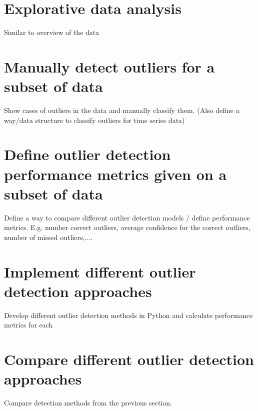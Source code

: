 \section{Explorative data analysis}
Similar to overview of the data
\section{Manually detect outliers for a subset of data}
Show cases of outliers in the data and manually classify them. (Also define a way/data structure to classify outliers for time series data)
\section{Define outlier detection performance metrics given on a subset of data}
Define a way to compare different outlier detection models / define performance metrics. E.g. number correct outliers, average confidence for the correct outliers, number of missed outliers,.... 
\section{Implement different outlier detection approaches}
Develop different outlier detection methods in Python and calculate performance metrics for each
\section{Compare different outlier detection approaches}
Compare detection methods from the previous section.


